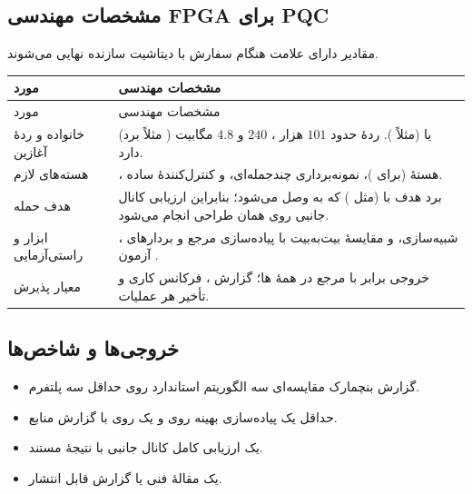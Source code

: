 \subsection{مشخصات مهندسی FPGA برای PQC}
مقادیر دارای علامت \verify{} هنگام سفارش با دیتاشیت سازنده نهایی می‌شوند.
\begin{longtable}{R{3.6cm}R{11.2cm}}
\toprule {} مورد & مشخصات مهندسی \\ \midrule
\endfirsthead
\toprule {} مورد & مشخصات مهندسی \\ \midrule
\endhead
خانواده و ردهٔ آغازین &  (مثلاً برد ) یا  (مثلاً ). ردهٔ  حدود $101$ هزار ، $240$  و $4.8$ مگابیت  دارد\verify{}. \\
هسته‌های لازم & ، هستهٔ  (برای )، نمونه‌برداری چندجمله‌ای، و کنترل‌کنندهٔ ساده. \\
هدف حمله & برد هدف  با  (مثل ) که به  وصل می‌شود؛ بنابراین ارزیابی کانال جانبی روی همان طراحی انجام می‌شود. \\
ابزار و راستی‌آزمایی & ، شبیه‌سازی، و مقایسهٔ بیت‌به‌بیت با پیاده‌سازی مرجع و بردارهای آزمون . \\
معیار پذیرش & خروجی برابر با مرجع در همهٔ ها؛ گزارش ، فرکانس کاری و تأخیر هر عملیات. \\
\bottomrule\end{longtable}

\subsection{خروجی‌ها و شاخص‌ها}
\begin{itemize}[leftmargin=*,itemsep=2pt]
\item گزارش بنچمارک مقایسه‌ای سه الگوریتم استاندارد روی حداقل سه پلتفرم.
\item حداقل یک پیاده‌سازی بهینه روی  و یک روی  با گزارش منابع.
\item یک ارزیابی کامل کانال جانبی با نتیجهٔ مستند.
\item یک مقالهٔ فنی یا گزارش قابل انتشار.
\end{itemize}


